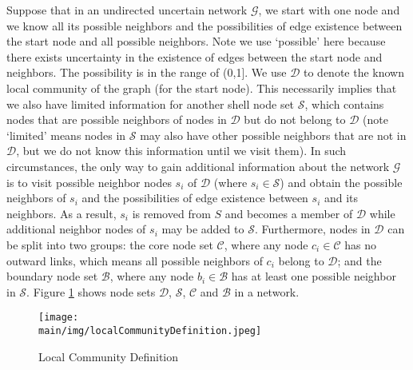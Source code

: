 \documentclass[\main/thesis.tex]{subfiles}
\begin{document}
Suppose that in an undirected uncertain network $\mathcal{G}$, we start with one node and we know all its possible neighbors and the possibilities of edge existence between the start node and all possible neighbors. Note we use `possible' here because there exists uncertainty in the existence of edges between the start node and neighbors. The possibility is in the range of (0,1]. We use $\mathcal{D}$ to denote the known local community of the graph (for the start node). This necessarily implies that we also have limited information for another shell node set $\mathcal{S}$, which contains nodes that are possible neighbors of nodes in $\mathcal{D}$ but do not belong to $\mathcal{D}$ (note `limited' means nodes in $\mathcal{S}$ may also have other possible neighbors that are not in $\mathcal{D}$, but we do not know this information until we visit them). In such circumstances, the only way to gain additional information about the network $\mathcal{G}$ is to visit possible neighbor nodes $s_i$ of $\mathcal{D}$ (where $s_i\in \mathcal{S}$) and obtain the possible neighbors of $s_i$ and the possibilities of edge existence between $s_i$ and its neighbors. As a result, $s_i$ is removed from $S$ and becomes a member of $\mathcal{D}$ while additional neighbor nodes of $s_i$ may be added to $\mathcal{S}$. Furthermore, nodes in $\mathcal{D}$ can be split into two groups: the core node set $\mathcal{C}$, where any node $c_i\in \mathcal{C}$ has no outward links, which means all possible neighbors of $c_i$ belong to $\mathcal{D}$; and the boundary node set $\mathcal{B}$, where any node $b_i\in \mathcal{B}$ has at least one possible neighbor in $\mathcal{S}$. Figure \ref{Local_Community_Definition} shows node sets $\mathcal{D}$, $\mathcal{S}$, $\mathcal{C}$ and $\mathcal{B}$ in a network.

\begin{figure}
\centering
\texttt{[image: \\main/img/localCommunityDefinition.jpeg]}
\caption{Local Community Definition}
\label{Local_Community_Definition}
\end{figure}
\end{document}
